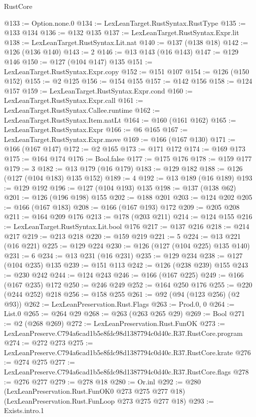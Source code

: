 \begin{lexlean}{RustCore}
\begin{coremodule}
@133 := Option.none.{0}
@134 := LexLeanTarget.RustSyntax.RustType
@135 := @133 @134
@136 := @132 @135
@137 := LexLeanTarget.RustSyntax.Expr.lit
@138 := LexLeanTarget.RustSyntax.Lit.nat
@140 := @137 (@138 @18)
@142 := @126 (@136 @140)
@143 := 2
@146 := @13 @143 (@16 @143)
@147 := @129 @146
@150 := @127 (@104 @147) @135
@151 := LexLeanTarget.RustSyntax.Expr.copy
@152 := @151 @107
@154 := @126 (@150 @152)
@155 := @2 @125
@156 := @154 @155
@157 := @142 @156
@158 := @124 @157
@159 := LexLeanTarget.RustSyntax.Expr.cond
@160 := LexLeanTarget.RustSyntax.Expr.call
@161 := LexLeanTarget.RustSyntax.Callee.runtime
@162 := LexLeanTarget.RustSyntax.Item.natLt
@164 := @160 (@161 @162)
@165 := LexLeanTarget.RustSyntax.Expr
@166 := @6 @165
@167 := LexLeanTarget.RustSyntax.Expr.move
@169 := @166 (@167 @130)
@171 := @166 (@167 @147)
@172 := @2 @165
@173 := @171 @172
@174 := @169 @173
@175 := @164 @174
@176 := Bool.false
@177 := @175 @176
@178 := @159 @177
@179 := 3
@182 := @13 @179 (@16 @179)
@183 := @129 @182
@188 := @126 (@127 (@104 @183) @135 @152)
@189 := 4
@192 := @13 @189 (@16 @189)
@193 := @129 @192
@196 := @127 (@104 @193) @135
@198 := @137 (@138 @62)
@201 := @126 (@196 @198) @155
@202 := @188 @201
@203 := @124 @202
@205 := @166 (@167 @183)
@208 := @166 (@167 @193) @172
@209 := @205 @208
@211 := @164 @209 @176
@213 := @178 (@203 @211)
@214 := @124 @155
@216 := LexLeanTarget.RustSyntax.Lit.bool @176
@217 := @137 @216
@218 := @214 @217
@219 := @213 @218
@220 := @159 @219
@221 := 5
@224 := @13 @221 (@16 @221)
@225 := @129 @224
@230 := @126 (@127 (@104 @225) @135 @140)
@231 := 6
@234 := @13 @231 (@16 @231)
@235 := @129 @234
@238 := @127 (@104 @235) @135
@239 := @151 @113
@242 := @126 (@238 @239) @155
@243 := @230 @242
@244 := @124 @243
@246 := @166 (@167 @225)
@249 := @166 (@167 @235) @172
@250 := @246 @249
@252 := @164 @250 @176
@255 := @220 (@244 @252) @218
@256 := @158 @255
@261 := @92 (@94 (@123 @256) (@2 @93))
@262 := LexLeanPreservation.Rust.Flags
@263 := Prod.{0, 0}
@264 := List.{0}
@265 := @264 @29
@268 := @263 (@263 @265 @29)
@269 := Bool
@271 := @2 (@268 @269)
@272 := LexLeanPreservation.Rust.FunOK
@273 := LexLeanPreserve.C794a6cad1b5e8fdc98d1387794c0d40c.R37.RustCore.program
@274 := @272 @273
@275 := LexLeanPreserve.C794a6cad1b5e8fdc98d1387794c0d40c.R37.RustCore.krate
@276 := @274 @275
@277 := LexLeanPreserve.C794a6cad1b5e8fdc98d1387794c0d40c.R37.RustCore.flags
@278 := @276 @277
@279 := @278 @18
@280 := Or.inl
@292 := @280
    (LexLeanPreservation.Rust.FunOK0 @273 @275 @277 @18)
    (LexLeanPreservation.Rust.FunLoop @273 @275 @277 @18)
@293 := Exists.intro.{1}

\end{coremodule}
\end{lexlean}
